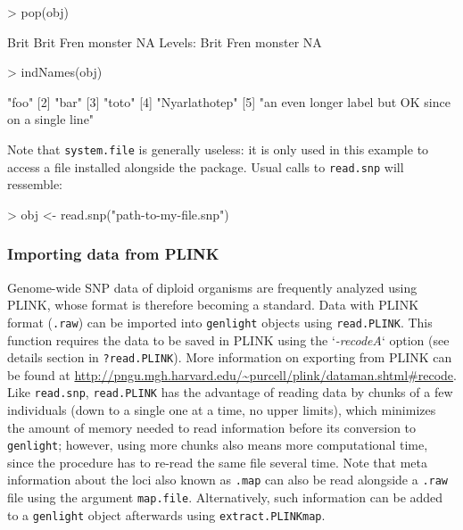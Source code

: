 \documentclass{article}
\begin{document}
\begin{Schunk}
\begin{Sinput}
> pop(obj)
\end{Sinput}
\begin{Soutput}
[1] Brit    Brit    Fren    monster NA     
Levels: Brit Fren monster NA
\end{Soutput}
\begin{Sinput}
> indNames(obj)
\end{Sinput}
\begin{Soutput}
[1] "foo"                                               
[2] "bar"                                               
[3] "toto"                                              
[4] "Nyarlathotep"                                      
[5] "an even longer label but OK since on a single line"
\end{Soutput}
\end{Schunk}
Note that \texttt{system.file} is generally useless: it is only used in this example to access a
file installed alongside the package. Usual calls to \texttt{read.snp} will ressemble:
\begin{Schunk}
\begin{Sinput}
> obj <- read.snp("path-to-my-file.snp")
\end{Sinput}
\end{Schunk}


\subsubsection{Importing data from PLINK}

Genome-wide SNP data of diploid organisms are frequently analyzed using PLINK, whose format is
therefore becoming a standard.
Data with PLINK format (\texttt{.raw}) can be imported into \texttt{genlight} objects using \texttt{read.PLINK}.
This function requires the data to be saved in PLINK using the `\textit{-recodeA}` option (see details
section in \texttt{?read.PLINK}).
More information on exporting from PLINK can be found at \url{http://pngu.mgh.harvard.edu/~purcell/plink/dataman.shtml#recode}.
\\


Like \texttt{read.snp}, \texttt{read.PLINK} has the advantage of reading data by chunks of a few individuals
(down to a single one at a time, no upper limits), which minimizes the amount of memory needed to read information
before its conversion to \texttt{genlight}; however, using more chunks also means more computational
time, since the procedure has to re-read the same file several time.
Note that meta information about the loci also known as \texttt{.map} can also be read alongside a
\texttt{.raw} file using the argument \texttt{map.file}.
Alternatively, such information can be added to a \texttt{genlight} object afterwards using \texttt{extract.PLINKmap}.
\end{document}
